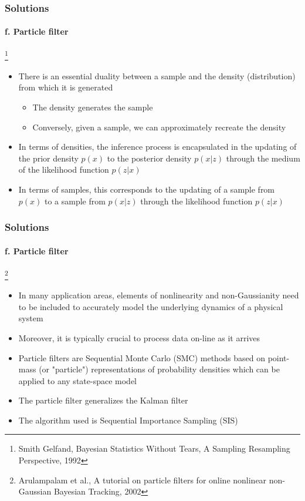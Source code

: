 \begin{frame}
\frametitle{Solutions}
\framesubtitle{f. Particle filter}
\mypagenum
\footnote{\tiny Smith Gelfand, Bayesian Statistics Without Tears, A Sampling Resampling Perspective, 1992}
\begin{itemize}
\item There is an essential duality between a sample and the density (distribution) from which it is generated
\begin{itemize}
\item The density generates the sample
\item Conversely, given a sample, we can approximately recreate the density
\end{itemize}
\item In terms of densities, the inference process is encapsulated in the updating of the prior density $p(x)$ to the posterior density $p(x|z)$ through the medium of the likelihood function $p(z|x)$
\item In terms of samples, this corresponds to the updating of a sample from $p(x)$ to a sample from $p(x|z)$ through the likelihood function $p(z|x)$
\end{itemize}
\end{frame}


\begin{frame}
\frametitle{Solutions}
\framesubtitle{f. Particle filter}
\mypagenum
\footnote{\tiny Arulampalam et al., A tutorial on particle filters for online nonlinear non-Gaussian Bayesian Tracking, 2002}
\begin{itemize}
\item In many application areas, elements of nonlinearity and non-Gaussianity need to be included to accurately model the underlying dynamics of a physical system
\item Moreover, it is typically crucial to process data on-line as it arrives
\item Particle filters are Sequential Monte Carlo (SMC) methods based on point-mass (or "particle") representations of probability densities which can be applied to any state-space model
\item The particle filter generalizes the Kalman filter
\item The algorithm used is Sequential Importance Sampling (SIS)
\end{itemize}
\end{frame}





